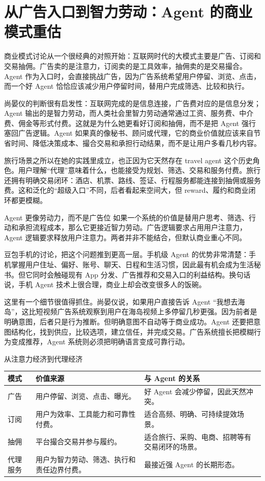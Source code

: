 \section{从广告入口到智力劳动：Agent 的商业模式重估}

商业模式讨论从一个很经典的对照开始：互联网时代的大模式主要是广告、订阅和交易抽佣。广告卖的是注意力，订阅卖的是工具效率，抽佣卖的是交易撮合。Agent 作为入口时，会直接挑战广告，因为广告系统希望用户停留、浏览、点击，而一个好 Agent 恰恰应该减少用户停留时间，替用户完成筛选、比较和执行。

尚晏仪的判断很有启发性：互联网完成的是信息连接，广告费对应的是信息分发；Agent 输出的是智力劳动，而人类社会里智力劳动通常通过工资、服务费、中介费、佣金等形式付费。这就是为什么她更看好订阅和抽佣，而不是把 Agent 强行塞回广告逻辑。Agent 如果真的像秘书、顾问或代理，它的商业价值就应该来自节省时间、降低决策成本、撮合交易和承担行动结果，而不是让用户多看几秒内容。

旅行场景之所以在她的实践里成立，也正因为它天然存在 travel agent 这个历史角色。用户理解“代理”意味着什么，也能接受为规划、筛选、交易和服务付费。旅行还拥有明确交易闭环：酒店、机票、路线、签证、行程服务都能连接到抽佣或服务费。这和泛化的“超级入口”不同，后者看起来空间大，但 reward、履约和商业闭环都更模糊。

\begin{importantbox}{Agent 更像劳动力，而不是广告位}
如果一个系统的价值是替用户思考、筛选、行动和承担流程成本，那么它更接近智力劳动。广告逻辑要求占用用户注意力，Agent 逻辑要求释放用户注意力。两者并非不能结合，但默认商业重心不同。
\end{importantbox}

豆包手机的讨论，把这个问题推到更高一层。手机级 Agent 的优势非常清楚：手机掌握用户住址、偏好、账号、聊天、日程和生活习惯，因此最有机会成为生活秘书。但它同时会触碰现有 App 分发、广告推荐和交易入口的利益结构。换句话说，手机 Agent 技术上很合理，商业上却会改变很多人的饭碗。

这里有一个细节很值得抓住。尚晏仪说，如果用户直接告诉 Agent “我想去海岛”，这比短视频广告系统观察到用户在海岛视频上多停留几秒更强。因为前者是明确意图，后者只是行为推断。但明确意图不自动等于商业成功。Agent 还要把意图结构化，找到供应，比较选项，建立信任，并完成交易。广告系统擅长把模糊行为变成推荐，Agent 系统则必须把明确语言变成可靠行动。

\begin{knowledgebox}{从注意力经济到代理经济}
\begin{tabularx}{\textwidth}{>{\raggedright\arraybackslash}p{} Y Y}
\toprule
模式 & 价值来源 & 与 Agent 的关系 \\
\midrule
广告 & 用户停留、浏览、点击、曝光。 & 好 Agent 会减少停留，因此天然冲突。 \\
订阅 & 用户为效率、工具能力和可靠性付费。 & 适合高频、明确、可持续提效场景。 \\
抽佣 & 平台撮合交易并参与履约。 & 适合旅行、采购、电商、招聘等有交易闭环的场景。 \\
代理服务 & 用户为智力劳动、筛选、执行和责任边界付费。 & 最接近强 Agent 的长期形态。 \\
\bottomrule
\end{tabularx}
\end{knowledgebox}

